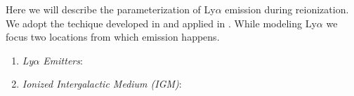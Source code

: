 Here we will describe the parameterization of Ly$\alpha$ emission during reionization.
We adopt the techique developed in \cite{2013ApJ...763..132S} and applied in \cite{2017ApJ...848...52H}. While modeling
Ly$\alpha$ we focus two locations from which emission happens.

\begin{enumerate}
\item \textit{Ly$\alpha$ Emitters}:
\item \textit{Ionized Intergalactic Medium (IGM)}:
\end{enumerate}
